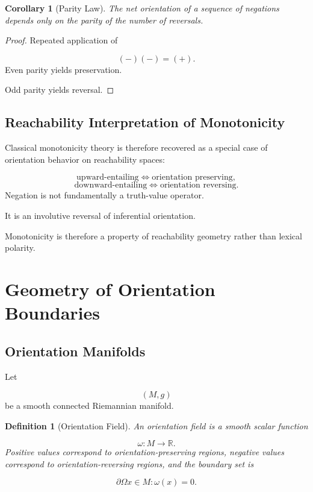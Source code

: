 \documentclass[12pt]{article}
\newtheorem{corollary}[theorem]{Corollary}
\newtheorem{definition}[theorem]{Definition}
\theoremstyle{remark}
\begin{document}
\begin{corollary}[Parity Law]
The net orientation of a sequence of negations depends only on the parity of the number of reversals.
\end{corollary}

\begin{proof}
Repeated application of

\[
(-)(-)=(+).
\]
Even parity yields preservation.

Odd parity yields reversal.
\end{proof}

\subsection{Reachability Interpretation of Monotonicity}

Classical monotonicity theory is therefore recovered as a special case of orientation behavior on reachability spaces:

\[
\text{upward-entailing}
\iff
\text{orientation preserving},
\]
\[
\text{downward-entailing}
\iff
\text{orientation reversing}.
\]
Negation is not fundamentally a truth-value operator.

It is an involutive reversal of inferential orientation.

Monotonicity is therefore a property of reachability geometry rather than lexical polarity.

\section{Geometry of Orientation Boundaries}

\subsection{Orientation Manifolds}

Let

\[
(M,g)
\]
be a smooth connected Riemannian manifold.

\begin{definition}[Orientation Field]
An orientation field is a smooth scalar function

\[
\omega:M\rightarrow\mathbb{R}.
\]
Positive values correspond to orientation-preserving regions, negative values correspond to orientation-reversing regions, and the boundary set is

\[
\partial\Omega
{x\in M:\omega(x)=0}.
\]
\end{definition}
\end{document}

